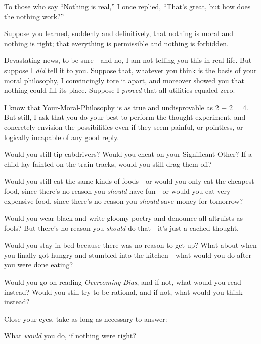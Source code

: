 
{
 To those who say ``Nothing is
real,'' I once replied,
``That's great, but how does the
nothing work?'' }

{
 Suppose you learned, suddenly and definitively, that nothing is
moral and nothing is right; that everything is permissible and nothing
is forbidden.}

{
 Devastating news, to be sure---and no, I am not telling you this
in real life. But suppose I \textit{did} tell it to you. Suppose that,
whatever you think is the basis of your moral philosophy, I
convincingly tore it apart, and moreover showed you that nothing could
fill its place. Suppose I \textit{proved} that all utilities equaled
zero.}

{
 I know that Your-Moral-Philosophy is as true and undisprovable as
2 + 2 = 4. But still, I ask that you do your best to perform the
thought experiment, and concretely envision the possibilities even if
they seem painful, or pointless, or logically incapable of any good
reply.}

{
 Would you still tip cabdrivers? Would you cheat on your
Significant Other? If a child lay fainted on the train tracks, would
you still drag them off?}

{
 Would you still eat the same kinds of foods---or would you only
eat the cheapest food, since there's no reason you
\textit{should} have fun---or would you eat very expensive food, since
there's no reason you \textit{should} save money for
tomorrow?}

{
 Would you wear black and write gloomy poetry and denounce all
altruists as fools? But there's no reason you
\textit{should} do that---it's just a cached thought.}

{
 Would you stay in bed because there was no reason to get up? What
about when you finally got hungry and stumbled into the kitchen---what
would you do after you were done eating?}

{
 Would you go on reading \textit{Overcoming Bias}, and if not, what
would you read instead? Would you still try to be rational, and if not,
what would you think instead?}

{
 Close your eyes, take as long as necessary to answer:}

{
 What \textit{would} you do, if nothing were right?}

\myendsectiontext


